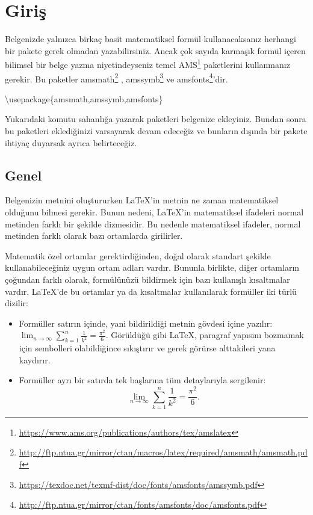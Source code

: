 \documentclass[
  10pt,
]{scrbook}
\newenvironment{Shaded}{\begin{snugshade}}{\end{snugshade}}
\newcommand{\BuiltInTok}[1]{#1}
\newcommand{\ExtensionTok}[1]{#1}
\newcommand{\NormalTok}[1]{#1}
\providecommand{\tightlist}{%
  \setlength{\itemsep}{0pt}\setlength{\parskip}{0pt}}
\renewcommand{\href}[2]{#2\footnote{\url{#1}}}
\theoremstyle{definition}
\theoremstyle{definition}
\theoremstyle{definition}
\theoremstyle{definition}
\theoremstyle{remark}
\begin{document}
\hypertarget{giriux15f-1}{%
\section{Giriş}\label{giriux15f-1}}

Belgenizde yalnızca birkaç basit matematiksel formül kullanacaksanız herhangi bir pakete gerek olmadan yazabilirsiniz. Ancak çok sayıda karmaşık formül içeren bilimsel bir belge yazma niyetindeyseniz temel \href{https://www.ams.org/publications/authors/tex/amslatex}{AMS} paketlerini kullanmanız gerekir. Bu paketler \href{http://ftp.ntua.gr/mirror/ctan/macros/latex/required/amsmath/amsmath.pdf}{amsmath} , \href{https://texdoc.net/texmf-dist/doc/fonts/amsfonts/amssymb.pdf}{amssymb} ve \href{http://ftp.ntua.gr/mirror/ctan/fonts/amsfonts/doc/amsfonts.pdf}{amsfonts}'dir.

\begin{Shaded}
\begin{Highlighting}[]
\BuiltInTok{\textbackslash{}usepackage}\NormalTok{\{}\ExtensionTok{amsmath,amssymb,amsfonts}\NormalTok{\}}
\end{Highlighting}
\end{Shaded}

Yukarıdaki komutu sahanlığa yazarak paketleri belgenize ekleyiniz. Bundan sonra bu paketleri eklediğinizi varsayarak devam edeceğiz ve bunların dışında bir pakete ihtiyaç duyarsak ayrıca belirteceğiz.

\hypertarget{genel-1}{%
\subsection{Genel}\label{genel-1}}

Belgenizin metnini oluştururken LaTeX'in metnin ne zaman matematiksel olduğunu bilmesi gerekir. Bunun nedeni, LaTeX'in matematiksel ifadeleri normal metinden farklı bir şekilde dizmesidir. Bu nedenle matematiksel ifadeler, normal metinden farklı olarak bazı ortamlarda girilirler.

Matematik özel ortamlar gerektirdiğinden, doğal olarak standart şekilde kullanabileceğiniz uygun ortam adları vardır. Bununla birlikte, diğer ortamların çoğundan farklı olarak, formülünüzü bildirmek için bazı kullanışlı kısaltmalar vardır. LaTeX'de bu ortamlar ya da kısaltmalar kullanılarak formüller iki türlü dizilir:

\begin{itemize}
\tightlist
\item
  Formüller satırın içinde, yani bildirildiği metnin gövdesi içine yazılır: \(\lim_{n \to \infty} \sum_{k=1}^n \frac{1}{k^2} =\frac{\pi^2}{6}\). Görüldüğü gibi LaTeX, paragraf yapısını bozmamak için sembolleri olabildiğince sıkıştırır ve gerek görürse alttakileri yana kaydırır.
\item
  Formüller ayrı bir satırda tek başlarına tüm detaylarıyla sergilenir: \[\lim_{n \to \infty} \sum_{k=1}^n
  \frac{1}{k^2} =\frac{\pi^2}{6}.\]
\end{itemize}
\end{document}
